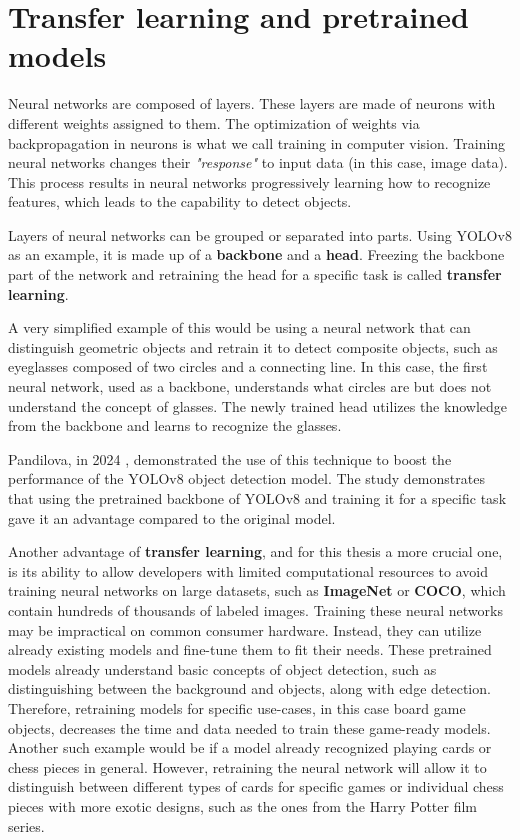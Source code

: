 
\section{Transfer learning and pretrained models}
\label{pretrainedModels}
\label{transferLearning}
Neural networks are composed of layers. These layers are made of neurons with different weights assigned to them. The optimization of weights via backpropagation in neurons is what we call training in computer vision. Training neural networks changes their \textit{"response"} to input data (in this case, image data). This process results in neural networks progressively learning how to recognize features, which leads to the capability to detect objects.

Layers of neural networks can be grouped or separated into parts. Using YOLOv8 as an example, it is made up of a \textbf{backbone} and a \textbf{head}. Freezing the backbone part of the network and retraining the head for a specific task is called \textbf{transfer learning}. 

A very simplified example of this would be using a neural network that can distinguish geometric objects and retrain it to detect composite objects, such as eyeglasses composed of two circles and a connecting line. In this case, the first neural network, used as a backbone, understands what circles are but does not understand the concept of glasses. The newly trained head utilizes the knowledge from the backbone and learns to recognize the glasses.

Pandilova, in 2024 \cite{pandilova2024transfer}, demonstrated the use of this technique to boost the performance of the YOLOv8 object detection model. The study demonstrates that using the pretrained backbone of YOLOv8 and training it for a specific task gave it an advantage compared to the original model.

Another advantage of \textbf{transfer learning}, and for this thesis a more crucial one, is its ability to allow developers with limited computational resources to avoid training neural networks on large datasets, such as \textbf{ImageNet} or \textbf{COCO}, which contain hundreds of thousands of labeled images. Training these neural networks may be impractical on common consumer hardware. Instead, they can utilize already existing models and fine-tune them to fit their needs. These pretrained models already understand basic concepts of object detection, such as distinguishing between the background and objects, along with edge detection. Therefore, retraining models for specific use-cases, in this case board game objects, decreases the time and data needed to train these game-ready models. Another such example would be if a model already recognized playing cards or chess pieces in general. However, retraining the neural network will allow it to distinguish between different types of cards for specific games or individual chess pieces with more exotic designs, such as the ones from the Harry Potter film series.

